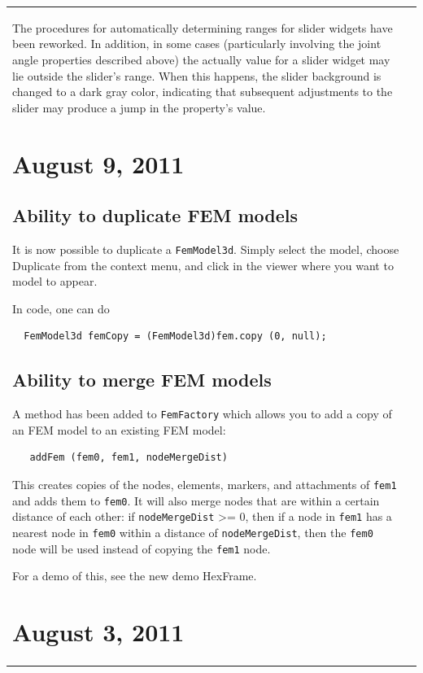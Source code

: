 \documentclass{article}
\begin{document}
\begin{tabular}{ll}
The procedures for automatically determining ranges for slider widgets
have been reworked. In addition, in some cases (particularly involving
the joint angle properties described above) the actually value for a slider
widget may lie outside the slider's range. When this happens,
the slider background is changed to a dark gray color, indicating that
subsequent adjustments to the slider may produce a jump in the
property's value.

\section*{August 9, 2011}

\subsection*{Ability to duplicate FEM models}

It is now possible to duplicate a {\tt FemModel3d}. Simply select the
model, choose {\sf Duplicate} from the context menu, and click in
the viewer where you want to model to appear.

In code, one can do

\begin{verbatim}
  FemModel3d femCopy = (FemModel3d)fem.copy (0, null);
\end{verbatim}

\subsection*{Ability to merge FEM models}

A method has been added to {\tt FemFactory} which allows you to add a copy
of an FEM model to an existing FEM model:

\begin{verbatim}
   addFem (fem0, fem1, nodeMergeDist)
\end{verbatim}

This creates copies of the nodes, elements, markers, and attachments
of {\tt fem1} and adds them to {\tt fem0}. It will also merge nodes that are
within a certain distance of each other: if {\tt nodeMergeDist} >= 0, then
if a node in {\tt fem1} has a nearest node in {\tt fem0} within a distance of
{\tt nodeMergeDist}, then the {\tt fem0} node will be used instead of copying
the {\tt fem1} node.

For a demo of this, see the new demo {\sf HexFrame}.

\section*{August 3, 2011}


\end{tabular}
\end{document}

